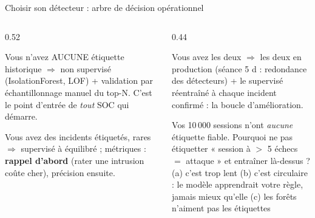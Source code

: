 \begin{frame}{Choisir son détecteur : arbre de décision opérationnel}
\begin{columns}[t]
\begin{column}{0.52\textwidth}
\begin{block}{Vous n'avez AUCUNE étiquette historique}
$\Rightarrow$ non supervisé (IsolationForest, LOF) + validation par
échantillonnage manuel du top-N. C'est le point d'entrée de \emph{tout}
SOC qui démarre.
\end{block}
\begin{block}{Vous avez des incidents étiquetés, rares}
$\Rightarrow$ supervisé à  équilibré ; métriques :
\textbf{rappel d'abord} (rater une intrusion coûte cher), précision ensuite.
\end{block}
\end{column}
\begin{column}{0.44\textwidth}
\begin{block}{Vous avez les deux}
$\Rightarrow$ les deux en production (séance 5 d : redondance des
détecteurs) + le supervisé réentraîné à chaque incident confirmé : la
boucle d'amélioration.
\end{block}
\begin{qbox}[Question]
Vos 10\,000 sessions n'ont \emph{aucune} étiquette fiable. Pourquoi ne pas
étiquetter « session à $>$ 5 échecs $=$ attaque » et entraîner là-dessus ?\\
(a) c'est trop lent \quad (b) c'est circulaire : le modèle apprendrait votre
règle, jamais mieux qu'elle \quad (c) les forêts n'aiment pas les étiquettes
\end{qbox}
\end{column}
\end{columns}
\end{frame}

